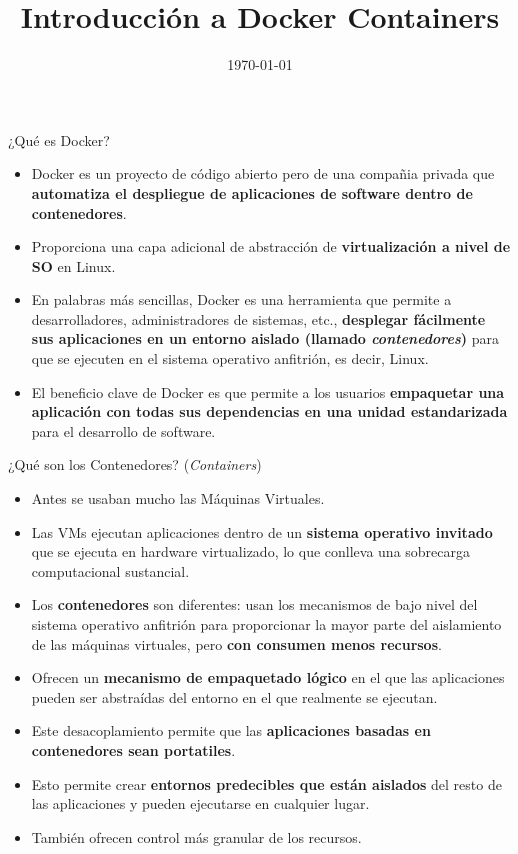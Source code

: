 \documentclass[aspectratio=169]{beamer} %
\title{Introducción a Docker Containers}
\date{\today}
\begin{document}
\begin{frame}
    \titlepage
\end{frame}

\begin{frame}{¿Qué es Docker?}
    \begin{itemize}
        \item Docker es un proyecto de código abierto pero de una compañia privada que \textbf{automatiza el despliegue de aplicaciones de software dentro de contenedores}.
        \item Proporciona una capa adicional de abstracción de \textbf{virtualización a nivel de SO} en Linux.
        \item En palabras más sencillas, Docker es una herramienta que permite a desarrolladores, administradores de sistemas, etc., \textbf{desplegar fácilmente sus aplicaciones en un entorno aislado (llamado \textit{contenedores})} para que se ejecuten en el sistema operativo anfitrión, es decir, Linux.
        \item El beneficio clave de Docker es que permite a los usuarios \textbf{empaquetar una aplicación con todas sus dependencias en una unidad estandarizada} para el desarrollo de software.
    \end{itemize}
\end{frame}

\begin{frame}{¿Qué son los Contenedores? (\textit{Containers})}
    \begin{itemize}
        \item Antes se usaban mucho las Máquinas Virtuales.
        \item Las VMs ejecutan aplicaciones dentro de un \textbf{sistema operativo invitado} que se ejecuta en hardware virtualizado, lo que conlleva una sobrecarga computacional sustancial.
        \item Los \textbf{contenedores} son diferentes: usan los mecanismos de bajo nivel del sistema operativo anfitrión para proporcionar la mayor parte del aislamiento de las máquinas virtuales, pero \textbf{con consumen menos recursos}.
        \item Ofrecen un \textbf{mecanismo de empaquetado lógico} en el que las aplicaciones pueden ser abstraídas del entorno en el que realmente se ejecutan.
        \item Este desacoplamiento permite que las \textbf{aplicaciones basadas en contenedores sean portatiles}.
        \item Esto permite crear \textbf{entornos predecibles que están aislados} del resto de las aplicaciones y pueden ejecutarse en cualquier lugar.
        \item También ofrecen control más granular de los recursos.
    \end{itemize}
\end{frame}
\end{document}
